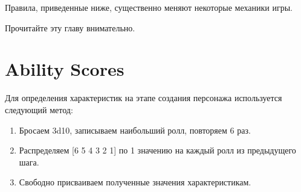 \documentclass[a4paper,11pt]{book}
\let\oldtabularx\tabularx
\let\endoldtabularx\endtabularx
\renewenvironment{tabularx}{
        \AlegreyaSansOsF
        \bigskip
        \noindent
        \rowcolors{2}{}{white!94!blue}
        \oldtabularx
        } {
        \endoldtabularx
        \medskip
        }
\begin{document}
\begin{multicols}{2}
Правила, приведенные ниже, существенно меняют некоторые механики игры.

Прочитайте эту главу внимательно.

\section{Ability Scores}

Для определения характеристик на этапе создания персонажа используется следующий метод:

\begin{enumerate}
    \item Бросаем 3d10, записываем наибольший ролл, повторяем 6 раз.
    \item Распределяем [6 5 4 3 2 1] по 1 значению на каждый ролл из предыдущего шага.
    \item Свободно присваиваем полученные значения характеристикам.
\end{enumerate}



%
%
%
%


\end{multicols}
\end{document}
